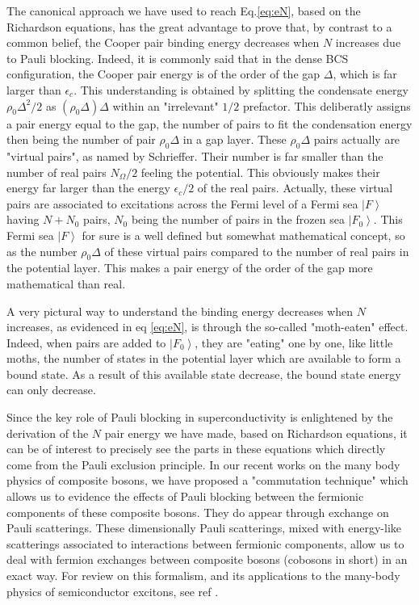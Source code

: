 \documentclass[aps,prb,amsmath,amssymb,superscriptaddress,twocolumn]{revtex4-1}
\begin{document}
The canonical approach we have used to reach Eq.\eqref{eq:eN}, based on the Richardson equations, has the great advantage to prove that, by contrast to a common belief, the Cooper pair binding energy decreases when $N$ increases due to Pauli blocking.  Indeed, it is commonly said that in the dense BCS configuration, the Cooper pair energy is of the order of the gap $\Delta$, which is far larger than $\epsilon_c$.  This understanding is obtained by splitting the condensate energy $\rho_0\Delta^2/2$ as $(\rho_0\Delta)\Delta$ within an "irrelevant" $1/2$ prefactor. This deliberatly assigns a pair energy equal to the gap, the number of pairs to fit the condensation energy then being the number of pair $\rho_0\Delta$ in a gap layer.  These   $\rho_0\Delta$ pairs actually are "virtual pairs", as named by Schrieffer.  Their number is far smaller than the number of real pairs $N_\Omega/2$ feeling the potential.  This obviously makes their energy far larger than the energy $\epsilon_c
 /2$ of the real pairs.  Actually, these virtual pairs are associated to excitations across the Fermi level of a Fermi sea $\left\vert F\right\rangle$ having $N+N_0$ pairs, $N_0$ being the number of pairs in the frozen sea $\left\vert F_{0}\right\rangle$. This Fermi sea $\left\vert F\right\rangle$ for sure is a well defined but somewhat mathematical concept, so as the number $\rho_0\Delta$ of these virtual pairs compared to the number of real pairs in the potential layer.  This makes a pair energy of the order of the gap more mathematical than real.  

A very pictural  way to understand the binding energy decreases when $N$ increases, as evidenced in eq \eqref{eq:eN}, is through the so-called "moth-eaten" effect. Indeed, when pairs are added to $\left\vert F_{0}\right\rangle$, they are "eating" one by one, like little moths, the number of states in the potential layer which are available to form a bound state.  As a result of this available state decrease, the bound state energy can only decrease.  

Since the key role of Pauli blocking in superconductivity is enlightened   by the derivation of the $N$ pair  energy we have made, based on Richardson equations, it can be of interest to precisely see the parts in these equations which directly come from the Pauli exclusion principle.  In our recent works on the many body  physics of composite bosons, we have proposed a "commutation technique" which allows us to evidence the effects of Pauli blocking between the fermionic components of these composite bosons.  They do appear through exchange on Pauli scatterings.  These dimensionally Pauli scatterings, mixed with energy-like scatterings associated to interactions between fermionic components, allow us to deal with fermion exchanges between composite bosons (cobosons in short) in an exact way.  For review on this formalism, and its applications to the many-body physics of semiconductor excitons, see ref \cite{CobosonPhysicsReports,CobosonCalculation}.
\end{document}
